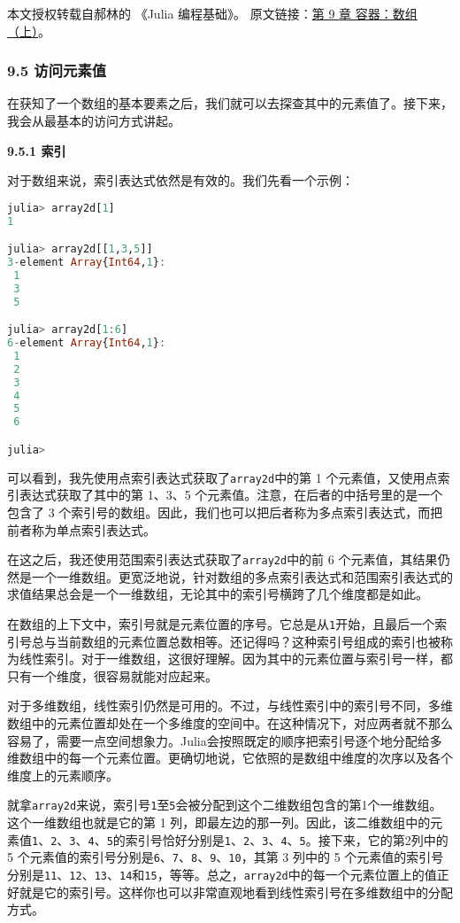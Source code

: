 
本文授权转载自郝林的 《Julia 编程基础》。 原文链接：\href{https://github.com/hyper0x/JuliaBasics/blob/master/book/ch09.md}{第 9 章 容器：数组（上）}。


\subsubsection{9.5 访问元素值}

在获知了一个数组的基本要素之后，我们就可以去探查其中的元素值了。接下来，我会从最基本的访问方式讲起。

\textbf{9.5.1 索引}

对于数组来说，索引表达式依然是有效的。我们先看一个示例：

\begin{lstlisting}[language=julia]
julia> array2d[1]
1

julia> array2d[[1,3,5]]
3-element Array{Int64,1}:
 1
 3
 5

julia> array2d[1:6]
6-element Array{Int64,1}:
 1
 2
 3
 4
 5
 6

julia> 
\end{lstlisting}

可以看到，我先使用点索引表达式获取了\verb|array2d|中的第 1 个元素值，又使用点索引表达式获取了其中的第 1、3、5 个元素值。注意，在后者的中括号里的是一个包含了 3 个索引号的数组。因此，我们也可以把后者称为多点索引表达式，而把前者称为单点索引表达式。

在这之后，我还使用范围索引表达式获取了\verb|array2d|中的前 6 个元素值，其结果仍然是一个一维数组。更宽泛地说，针对数组的多点索引表达式和范围索引表达式的求值结果总会是一个一维数组，无论其中的索引号横跨了几个维度都是如此。

在数组的上下文中，索引号就是元素位置的序号。它总是从\verb|1|开始，且最后一个索引号总与当前数组的元素位置总数相等。还记得吗？这种索引号组成的索引也被称为线性索引。对于一维数组，这很好理解。因为其中的元素位置与索引号一样，都只有一个维度，很容易就能对应起来。

对于多维数组，线性索引仍然是可用的。不过，与线性索引中的索引号不同，多维数组中的元素位置却处在一个多维度的空间中。在这种情况下，对应两者就不那么容易了，需要一点空间想象力。Julia会按照既定的顺序把索引号逐个地分配给多维数组中的每一个元素位置。更确切地说，它依照的是数组中维度的次序以及各个维度上的元素顺序。

就拿\verb|array2d|来说，索引号\verb|1|至\verb|5|会被分配到这个二维数组包含的第1个一维数组。这个一维数组也就是它的第 1 列，即最左边的那一列。因此，该二维数组中的元素值\verb|1|、\verb|2|、\verb|3|、\verb|4|、\verb|5|的索引号恰好分别是\verb|1|、\verb|2|、\verb|3|、\verb|4|、\verb|5|。接下来，它的第2列中的 5 个元素值的索引号分别是\verb|6|、\verb|7|、\verb|8|、\verb|9|、\verb|10|，其第 3 列中的 5 个元素值的索引号分别是\verb|11|、\verb|12|、\verb|13|、\verb|14|和\verb|15|，等等。总之，\verb|array2d|中的每一个元素位置上的值正好就是它的索引号。这样你也可以非常直观地看到线性索引号在多维数组中的分配方式。

